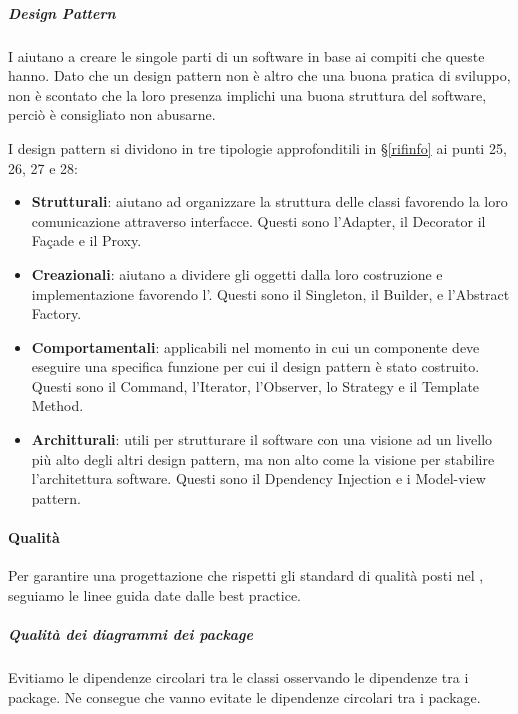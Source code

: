         \subparagraph{Design Pattern}
        I  aiutano a creare le singole parti di un software in base ai compiti che queste hanno. Dato che un design pattern non è altro che una buona pratica di sviluppo, non è scontato che la loro presenza implichi una buona struttura del software, perciò è consigliato non abusarne. \par
        I design pattern si dividono in tre tipologie approfonditili in \S\ref{rifinfo} ai punti 25, 26, 27 e 28:
        \begin{itemize}
            \item \textbf{Strutturali}: aiutano ad organizzare la struttura delle classi favorendo la loro comunicazione attraverso interfacce. Questi sono l'Adapter, il Decorator il Façade e il Proxy.
            \item \textbf{Creazionali}: aiutano a dividere gli oggetti dalla loro costruzione e implementazione favorendo l'. Questi sono il Singleton, il Builder, e l'Abstract Factory.
            \item \textbf{Comportamentali}: applicabili nel momento in cui un componente deve eseguire una specifica funzione per cui il design pattern è stato costruito. Questi sono il Command, l'Iterator, l'Observer, lo Strategy e il Template Method.
            \item \textbf{Architturali}: utili per strutturare il software con una visione ad un livello più alto degli altri design pattern, ma non alto come la visione per stabilire l'architettura software. Questi sono il Dpendency Injection e i Model-view pattern.
        \end{itemize}



		\paragraph{Qualità}\label{PP:Sviluppo:QualitàProgettazione}
		Per garantire una progettazione che rispetti gli standard di qualità posti nel {\PdQd}, seguiamo le linee guida date dalle best practice.

        \subparagraph{Qualità dei diagrammi dei package}
        Evitiamo le dipendenze circolari tra le classi osservando le dipendenze tra i package. Ne consegue che vanno evitate le dipendenze circolari tra i package.

